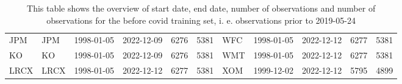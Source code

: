 \begin{table}[ht]
\begin{tabular}{llllrrlllrr}
  JPM & JPM & 1998-01-05 & 2022-12-09 & 6276 & 5381 & WFC & 1998-01-05 & 2022-12-12 & 6277 & 5381 \\ 
  KO & KO & 1998-01-05 & 2022-12-09 & 6276 & 5381 & WMT & 1998-01-05 & 2022-12-12 & 6277 & 5381 \\ 
  LRCX & LRCX & 1998-01-05 & 2022-12-12 & 6277 & 5381 & XOM & 1999-12-02 & 2022-12-12 & 5795 & 4899 \\ 
   \hline
\end{tabular}
\caption[Overview]{This table shows the overview of start date, end date, number of observations and number of observations 
                     for the before covid training set, i. e. observations prior to 2019-05-24} 
\label{Table:Overview}
\end{table}
